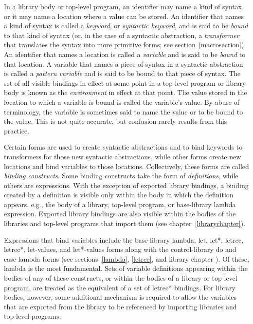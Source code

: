 In a library body or top-level program,
an identifier may name a kind of syntax, or it may name
a location where a value can be stored.  An identifier that names a kind
of syntax is called a {\em keyword}, or {\em syntactic keyword},
and is said to be {\em bound} to that kind of syntax (or, in the case of a
syntactic abstraction, a {\em transformer} that translates the syntax into more
primitive forms; see section~\ref{macrosection}).  An identifier that names a
location is called a {\em variable} and is said to be
{\em bound} to that location.  
A variable that names a piece of syntax in a syntactic abstraction is
called a \textit{pattern variable} and is said
to be bound to that piece of syntax.
The set of all visible
bindings in effect at some point in a top-level program or
library body is
known as the {\em environment} in effect at that point.  The value
stored in the location to which a variable is bound is called the
variable's value.  By abuse of terminology, the variable is sometimes
said to name the value or to be bound to the value.  This is not quite
accurate, but confusion rarely results from this practice.



\vest Certain forms are used to create syntactic abstractions
and to bind keywords to transformers for those new syntactic abstractions, while other
forms create new locations and bind variables to those
locations.  Collectively, these forms are called {\em binding
  constructs}.
Some binding constructs take the form of
\textit{definitions}, while others are
expressions.
With the exception of exported library bindings, a binding created
by a definition is visible only within the body in which the
definition appears, e.g., the body of a library, top-level program,
or base-library {\cf lambda} expression.
Exported library bindings are also visible within the bodies of
the libraries and top-level programs that import them (see
chapter~\ref{librarychapter}).

Expressions that bind variables include the base-library {\cf lambda},
{\cf let}, {\cf let*}, {\cf letrec}, {\cf letrec*}, {\cf let-values},
and {\cf let*-values} forms along with the control-library {\cf do} and
{\cf case-lambda} forms
(see sections~\ref{lambda}, \ref{letrec}, and library chapter
).
Of these, {\cf lambda} is the most fundamental.
Sets of variable definitions appearing within the bodies of any of
these constructs, or within the bodies of a library or top-level
program, are treated as the equivalent of a set of
{\cf letrec*} bindings.
For library bodies, however, some additional mechanism is required to
allow the variables that are exported from the library to be referenced by
importing libraries and top-level programs.

